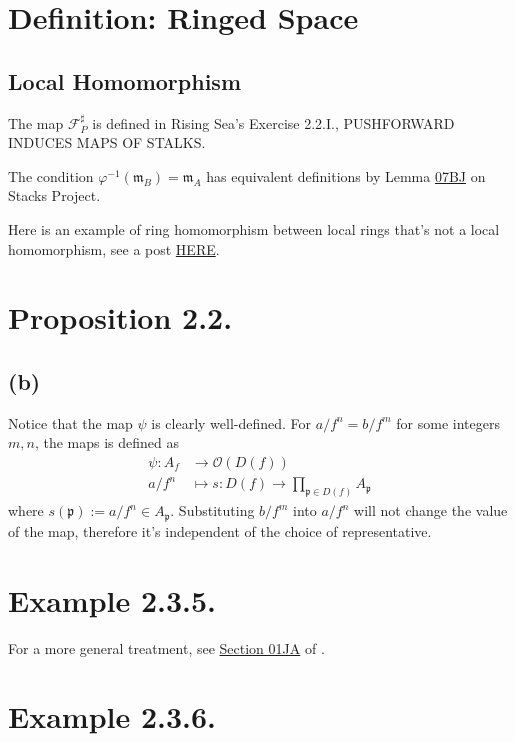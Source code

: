 \section{Definition: Ringed Space}

\subsection{Local Homomorphism}

The map $\mathscr F^{\sharp}_P$ is defined in Rising Sea's Exercise 2.2.I., PUSHFORWARD INDUCES MAPS OF STALKS.

The condition $\varphi^{-1}(\mathfrak m_B)=\mathfrak m_A$ has equivalent definitions by Lemma \href{https://stacks.math.columbia.edu/tag/07BH}{07BJ} on Stacks Project.

Here is an example of ring homomorphism between local rings that's not a local homomorphism, see a post \href{https://math.stackexchange.com/questions/3752503/example-of-non-local-homomorphism-on-local-rings}{HERE}.

\section{Proposition 2.2.}

\subsection{(b)}

Notice that the map $\psi$ is clearly well-defined.
For $a/f^n=b/f^m$ for some integers $m,n$, the maps is defined as 
\begin{align*}
    \psi:A_f &\to \mathcal O(D(f))\\
    a/f^n &\mapsto s: D(f)\to\prod_{\mathfrak p\in D(f)}A_{\mathfrak p}
\end{align*}where $s(\mathfrak p):=a/f^n\in A_{\mathfrak p}$. Substituting $b/f^m$ into $a/f^n$ will not change the value of the map, therefore it's independent of the choice of representative.

\section{Example 2.3.5.}

For a more general treatment, see \href{https://stacks.math.columbia.edu/tag/01JA}{Section 01JA} of \cite{stacks-project}.

\section{Example 2.3.6.}

